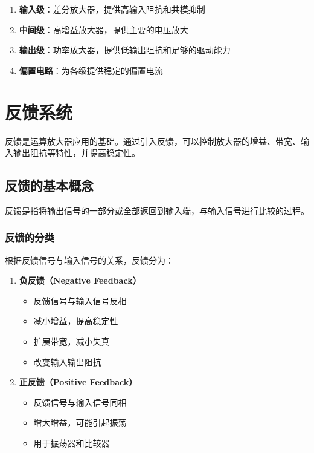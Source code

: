 \begin{enumerate}
  \item \textbf{输入级}：差分放大器，提供高输入阻抗和共模抑制
  \item \textbf{中间级}：高增益放大器，提供主要的电压放大
  \item \textbf{输出级}：功率放大器，提供低输出阻抗和足够的驱动能力
  \item \textbf{偏置电路}：为各级提供稳定的偏置电流
\end{enumerate}

\section{反馈系统}

反馈是运算放大器应用的基础。通过引入反馈，可以控制放大器的增益、带宽、输入输出阻抗等特性，并提高稳定性。

\subsection{反馈的基本概念}

反馈是指将输出信号的一部分或全部返回到输入端，与输入信号进行比较的过程。

\subsubsection{反馈的分类}

根据反馈信号与输入信号的关系，反馈分为：

\begin{enumerate}
  \item \textbf{负反馈（Negative Feedback）}
    \begin{itemize}
      \item 反馈信号与输入信号反相
      \item 减小增益，提高稳定性
      \item 扩展带宽，减小失真
      \item 改变输入输出阻抗
    \end{itemize}

  \item \textbf{正反馈（Positive Feedback）}
    \begin{itemize}
      \item 反馈信号与输入信号同相
      \item 增大增益，可能引起振荡
      \item 用于振荡器和比较器
    \end{itemize}
\end{enumerate}

